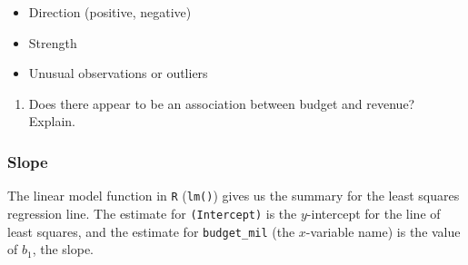 \documentclass[
]{report}
\newenvironment{Shaded}{\begin{snugshade}}{\end{snugshade}}
\newcommand{\AttributeTok}[1]{\textcolor[rgb]{0.77,0.63,0.00}{#1}}
\newcommand{\CommentTok}[1]{\textcolor[rgb]{0.56,0.35,0.01}{\textit{#1}}}
\newcommand{\FunctionTok}[1]{\textcolor[rgb]{0.00,0.00,0.00}{#1}}
\newcommand{\NormalTok}[1]{#1}
\newcommand{\OtherTok}[1]{\textcolor[rgb]{0.56,0.35,0.01}{#1}}
\newcommand{\SpecialCharTok}[1]{\textcolor[rgb]{0.00,0.00,0.00}{#1}}
\providecommand{\tightlist}{%
  \setlength{\itemsep}{0pt}\setlength{\parskip}{0pt}}
\begin{document}
\vspace{.2in}

\begin{itemize}
\tightlist
\item
  Direction (positive, negative)
\end{itemize}

\vspace{.2in}

\begin{itemize}
\tightlist
\item
  Strength
\end{itemize}

\vspace{.2in}

\begin{itemize}
\tightlist
\item
  Unusual observations or outliers
\end{itemize}

\vspace{.2in}

\begin{enumerate}
\def\labelenumi{\arabic{enumi}.}
\setcounter{enumi}{4}
\tightlist
\item
  Does there appear to be an association between budget and revenue? Explain.
\end{enumerate}

\vspace{1in}

\newpage

\hypertarget{slope}{%
\subsubsection*{Slope}\label{slope}}

The linear model function in \texttt{R} (\texttt{lm()}) gives us the summary for the least squares regression line. The estimate for \texttt{(Intercept)} is the \(y\)-intercept for the line of least squares, and the estimate for \texttt{budget\_mil} (the \(x\)-variable name) is the value of \(b_1\), the slope.

\begin{Shaded}
\end{Shaded}
\end{document}
